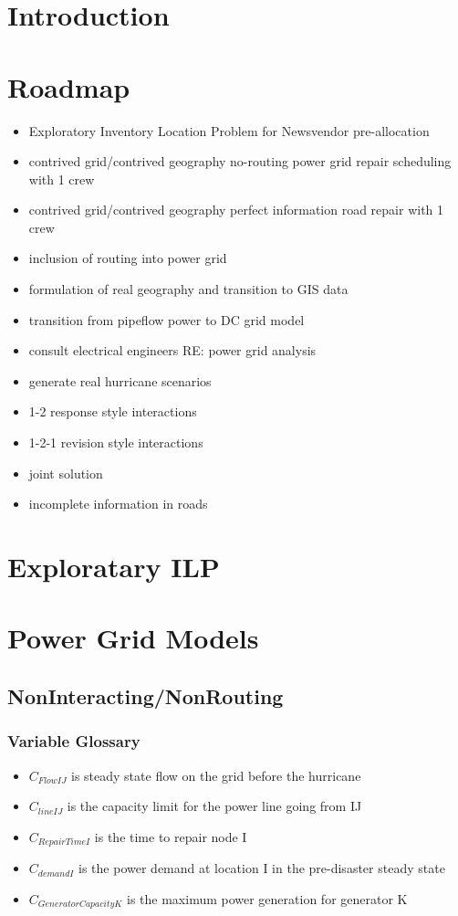 \documentclass{article}
\begin{document}
	\section{Introduction}
	\section{Roadmap}
	\begin{itemize}
		\item Exploratory Inventory Location Problem for Newsvendor pre-allocation
		\item contrived grid/contrived geography no-routing power grid repair scheduling with 1 crew
		\item contrived grid/contrived geography perfect information road repair with 1 crew
		\item inclusion of routing into power grid
		\item formulation of real geography and transition to GIS data
		\item transition from pipeflow power to DC grid model
		\item consult electrical engineers RE: power grid analysis
		\item generate real hurricane scenarios
		\item 1-2 response style interactions
		\item 1-2-1 revision style interactions
		\item joint solution
		\item incomplete information in roads
		
	\end{itemize}
	\section{Exploratary ILP}
	\section{Power Grid Models}
	\subsection{NonInteracting/NonRouting}
	\subsubsection{Variable Glossary}
	\begin{itemize}
		\item $C_{FlowIJ}$ is steady state flow on the grid before the hurricane
		\item $C_{lineIJ}$ is the capacity limit for the power line going from IJ
		\item $C_{RepairTimeI}$ is the time to repair node I
		\item $C_{demandI}$ is the power demand at location I in the pre-disaster steady state
		\item $C_{GeneratorCapacityK}$ is the maximum power generation for generator K
	\end{itemize}
\end{document}
